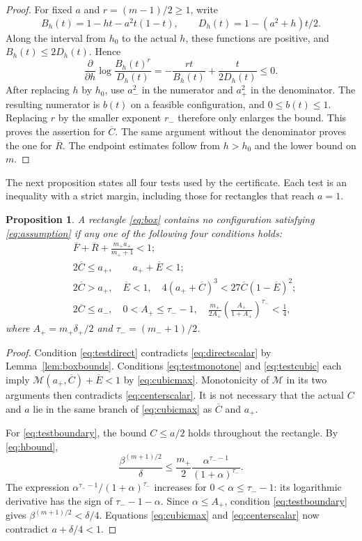 \documentclass[11pt,letterpaper,reqno]{amsart}
\newtheorem{prop}[thm]{Proposition}
\theoremstyle{definition}
\numberwithin{equation}{section}
\newcommand{\M}{\mathcal M}
\begin{document}
\begin{proof}
For fixed $a$ and $r=(m-1)/2\ge1$, write
\[
 B_h(t)=1-ht-a^2t(1-t),\qquad D_h(t)=1-(a^2+h)t/2.
\]
Along the interval from $h_0$ to the actual $h$, these functions are positive, and $B_h(t)\le2D_h(t)$. Hence
\[
 \frac{\partial}{\partial h}\log\frac{B_h(t)^r}{D_h(t)}
 =-\frac{rt}{B_h(t)}+\frac{t}{2D_h(t)}\le0.
\]
After replacing $h$ by $h_0$, use $a_-^2$ in the numerator and $a_+^2$ in the denominator. The resulting numerator is $b(t)$ on a feasible configuration, and $0\le b(t)\le1$. Replacing $r$ by the smaller exponent $r_-$ therefore only enlarges the bound. This proves the assertion for $\overline C$. The same argument without the denominator proves the one for $\overline R$. The endpoint estimates follow from $h>h_0$ and the lower bound on $m$.
\end{proof}

The next proposition states all four tests used by the certificate. Each test is an inequality with a strict margin, including those for rectangles that reach $a=1$.

\begin{prop}\label{prop:boxtests}
A rectangle \eqref{eq:box} contains no configuration satisfying \eqref{eq:assumption} if any one of the following four conditions holds:
\begin{align}
 &\overline F+\overline R+\frac{m_+a_+}{m_++1}<1;
 \label{eq:testdirect}\\
 &2\overline C\le a_+,\qquad a_++\overline E<1;
 \label{eq:testmonotone}\\
 &2\overline C>a_+,\quad\overline E<1,\quad
 4(a_++\overline C)^3<27\overline C(1-\overline E)^2;
 \label{eq:testcubic}\\
 &2\overline C\le a_-,\quad 0<A_+\le\tau_--1,\quad
 \frac{m_+}{2A_+}\left(\frac{A_+}{1+A_+}\right)^{\tau_-}<\frac14,
 \label{eq:testboundary}
\end{align}
where $A_+=m_+\delta_+/2$ and $\tau_-=(m_-+1)/2$.
\end{prop}

\begin{proof}
Condition \eqref{eq:testdirect} contradicts \eqref{eq:directscalar} by Lemma~\ref{lem:boxbounds}. Conditions \eqref{eq:testmonotone} and \eqref{eq:testcubic} each imply
$\M(a_+,\overline C)+\overline E<1$ by \eqref{eq:cubicmax}. Monotonicity of $\M$ in its two arguments then contradicts \eqref{eq:centerscalar}. It is not necessary that the actual $C$ and $a$ lie in the same branch of \eqref{eq:cubicmax} as $\overline C$ and $a_+$.

For \eqref{eq:testboundary}, the bound $C\le a/2$ holds throughout the rectangle. By \eqref{eq:hbound},
\[
 \frac{\beta^{(m+1)/2}}{\delta}
 \le\frac{m_+}{2}\frac{\alpha^{\tau_--1}}{(1+\alpha)^{\tau_-}}.
\]
The expression $\alpha^{\tau_--1}/(1+\alpha)^{\tau_-}$ increases for $0<\alpha\le\tau_--1$: its logarithmic derivative has the sign of $\tau_--1-\alpha$. Since $\alpha\le A_+$, condition \eqref{eq:testboundary} gives $\beta^{(m+1)/2}<\delta/4$. Equations \eqref{eq:cubicmax} and \eqref{eq:centerscalar} now contradict $a+\delta/4<1$.
\end{proof}
\end{document}
